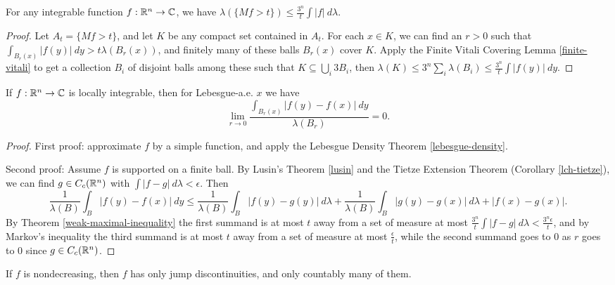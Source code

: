 \documentclass[letterpaper,11pt]{report}
\begin{document}
\begin{thm}\label{weak-maximal-inequality} For any integrable function $f : \mathbb{R}^n \rightarrow \mathbb{C}$, we have $\lambda(\{Mf > t\}) \le \frac{3^n}{t}\int |f|\ d\lambda$.
\end{thm}
\begin{proof} Let $A_t = \{Mf > t\}$, and let $K$ be any compact set contained in $A_t$. For each $x \in K$, we can find an $r > 0$ such that $\int_{B_r(x)} |f(y)|\ dy > t\lambda(B_r(x))$, and finitely many of these balls $B_r(x)$ cover $K$. Apply the Finite Vitali Covering Lemma \ref{finite-vitali} to get a collection $B_i$ of disjoint balls among these such that $K \subseteq \bigcup_i 3B_i$, then $\lambda(K) \le 3^n\sum_i \lambda(B_i) \le \frac{3^n}{t} \int |f(y)|\ dy$.
\end{proof}


\begin{thm}\label{lebesgue-differentiation} If $f : \mathbb{R}^n \rightarrow \mathbb{C}$ is locally integrable, then for Lebesgue-a.e. $x$ we have
\[
\lim_{r \rightarrow 0} \frac{\int_{B_r(x)} |f(y)-f(x)|\ dy}{\lambda(B_r)} = 0.
\]
\end{thm}
\begin{proof} First proof: approximate $f$ by a simple function, and apply the Lebesgue Density Theorem \ref{lebesgue-density}.

Second proof: Assume $f$ is supported on a finite ball. By Lusin's Theorem \ref{lusin} and the Tietze Extension Theorem (Corollary \ref{lch-tietze}), we can find $g \in C_c(\mathbb{R}^n)$ with $\int |f-g|\ d\lambda < \epsilon$. Then
\[
\frac{1}{\lambda(B)}\int_{B} |f(y)-f(x)|\ dy \le \frac{1}{\lambda(B)}\int_B |f(y) - g(y)|\ d\lambda + \frac{1}{\lambda(B)}\int_B |g(y) - g(x)|\ d\lambda + |f(x) - g(x)|.
\]
By Theorem \ref{weak-maximal-inequality} the first summand is at most $t$ away from a set of measure at most $\frac{3^n}{t} \int |f-g|\ d\lambda < \frac{3^n\epsilon}{t}$, and by Markov's inequality the third summand is at most $t$ away from a set of measure at most $\frac{\epsilon}{t}$, while the second summand goes to $0$ as $r$ goes to $0$ since $g \in C_c(\mathbb{R}^n)$.
\end{proof}

\begin{prop} If $f$ is nondecreasing, then $f$ has only jump discontinuities, and only countably many of them.
\end{prop}
\end{document}
